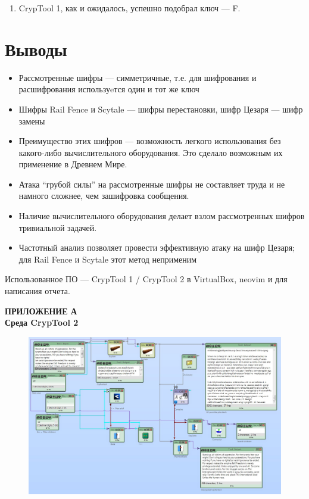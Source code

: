\documentclass[a4paper, 14pt]{extarticle}
\begin{document}
\begin{enumerate}
\begin{figure}[h]
        \caption{Диаграмма для зашифрованного текста}%
        \label{img:caesar:3}
    \end{figure}
    Диаграммы на рисунках~\ref{img:caesar:1} и~\ref{img:caesar:3} действительно похожи, однако из-за меньшего размера второго файла имеются расхождения.
    \item CrypTool 1, как и ожидалось, успешно подобрал ключ --- F.
\end{enumerate}

\FloatBarrier{}
\section*{Выводы}
\begin{itemize}
    \item Рассмотренные шифры --- симметричные, т.е. для шифрования и расшифрования используeтся один и тот же ключ
    \item Шифры Rail Fence и Scytale --- шифры перестановки, шифр Цезаря --- шифр замены
    \item Преимущество этих шифров --- возможность легкого использования без какого-либо вычислительного оборудования. Это сделало возможным их применение в Древнем Мире.
    \item Атака ``грубой силы'' на рассмотренные шифры не составляет труда и не намного сложнее, чем зашифровка сообщения.
    \item Наличие вычислительного оборудования делает взлом рассмотренных шифров тривиальной задачей.
    \item Частотный анализ позволяет провести эффективную атаку на шифр Цезаря; для Rail Fence и Scytale этот метод неприменим\\
\end{itemize}

Использованное ПО --- CrypTool 1 / CrypTool 2 в VirtualBox, neovim и \XeLaTeX{} для написания отчета.

\newpage

\begin{center}
    \bfseries
    \MakeUppercase{Приложение А}\\
    Среда CrypTool 2
\end{center}
\begin{figure}[h]
    \centering
    \includegraphics[angle=90,height=0.77\textheight]{img/L1.jpg}
\end{figure}
\end{document}
